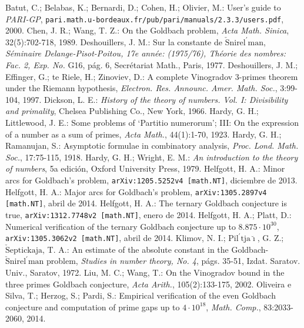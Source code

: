 \documentclass[11pt,a4paper,openright,oneside]{article}
\numberwithin{equation}{section}
\theoremstyle{definition}
\begin{document}
\newpage
\begin{thebibliography}{25}
     Batut, C.; Belabas, K.; Bernardi, D.; Cohen, H.; Olivier, M.: User's guide to \textit{PARI-GP},  \newline \texttt{pari.math.u-bordeaux.fr/pub/pari/manuals/2.3.3/users.pdf}, 2000.
     Chen, J. R.; Wang, T. Z.: On the Goldbach problem, \textit{Acta Math. Sinica}, 32(5):702-718, 1989.
     Deshouillers, J. M.: Sur la constante de $\check{\text{S}}\text{nirel}^{\prime} \text{man}$, \textit{S\'eminaire Delange-Pisot-Poitou, 17e ann\'ee: (1975/76), Th\'eorie des nombres: Fac. 2, Exp. No.} G16, p\'ag. 6, Secr\'etariat Math., Paris, 1977.
     Deshouillers, J. M.; Effinger, G.; te Riele, H.; Zinoviev, D.: A complete Vinogradov 3-primes theorem under the Riemann hypothesis, \textit{Electron. Res. Announc. Amer. Math. Soc.}, 3:99-104, 1997.
     Dickson, L. E.: \textit{History of the theory of numbers. Vol. I: Divisibility and primality}, Chelsea Publishing Co., New York, 1966.
     Hardy, G. H.; Littlewood, J. E.: Some problems of \textquoteleft Partitio numerorum\textquoteright; III: On the expression of a number as a sum of primes, \textit{Acta Math.}, 44(1):1-70, 1923.
     Hardy, G. H.; Ramanujan, S.: Asymptotic formulae in combinatory analysis, \textit{Proc. Lond. Math. Soc.}, 17:75-115, 1918.
     Hardy, G. H.; Wright, E. M.: \textit{An introduction to the theory of numbers}, 5a edici\'on, Oxford University Press, 1979.
     Helfgott, H. A.: Minor arcs for Goldbach's problem, \newline \texttt{arXiv:1205.5252v4 [math.NT]}, diciembre de 2013.
     Helfgott, H. A.: Major arcs for Goldbach's problem, \newline \texttt{arXiv:1305.2897v4 [math.NT]}, abril de 2014.
     Helfgott, H. A.: The ternary Goldbach conjecture is true, \newline \texttt{arXiv:1312.7748v2 [math.NT]}, enero de 2014.
     Helfgott, H. A.; Platt, D.: Numerical verification of the ternary Goldbach conjecture up to $8.875 \cdot 10^{30}$, \texttt{arXiv:1305.3062v2 [math.NT]}, abril de 2014.
     Klimov, N. I.; $\text{Pil}^{\prime} \text{tja}\breve{\imath}$, G. Z.; $\check{\text{S}}\text{eptickaja}$, T. A.: An estimate of the absolute constant in the Goldbach-$\check{\text{S}}\text{nirel}^{\prime} \text{man}$ problem, \textit{Studies in number theory, No. 4}, p\'ags. 35-51, Izdat. Saratov. Univ., Saratov, 1972.
     Liu, M. C.; Wang, T.: On the Vinogradov bound in the three primes Goldbach conjecture, \textit{Acta Arith.}, 105(2):133-175, 2002.
     Oliveira e Silva, T.; Herzog, S.; Pardi, S.: Empirical verification of the even Goldbach conjecture and computation of prime gaps up to $4\cdot10^{18}$, \textit{Math. Comp.}, 83:2033-2060, 2014.
\end{thebibliography}
\end{document}
